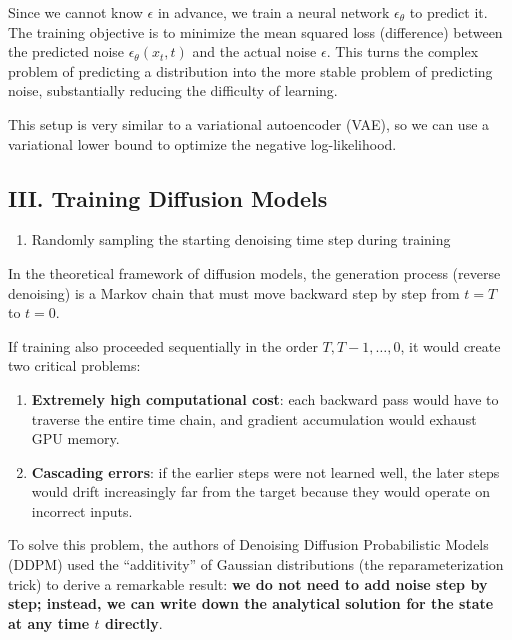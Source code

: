Since we cannot know \(\epsilon\) in advance, we train a neural network \(\epsilon_\theta\) to predict it. The training objective is to minimize the mean squared loss (difference) between the predicted noise \(\epsilon_\theta(x_t,t)\) and the actual noise \(\epsilon\). This turns the complex problem of predicting a distribution into the more stable problem of predicting noise, substantially reducing the difficulty of learning.

This setup is very similar to a variational autoencoder (VAE), so we can use a variational lower bound to optimize the negative log-likelihood.

\hypertarget{iii.-training-diffusion-models}{%
\subsection{III. Training Diffusion Models}\label{iii.-training-diffusion-models}}

\begin{enumerate}
\def\labelenumi{\arabic{enumi}.}
\tightlist
\item
  Randomly sampling the starting denoising time step during training
\end{enumerate}

In the theoretical framework of diffusion models, the generation process (reverse denoising) is a Markov chain that must move backward step by step from \(t=T\) to \(t=0\).

If training also proceeded sequentially in the order \(T,T-1,\ldots,0\), it would create two critical problems:

\begin{enumerate}
\def\labelenumi{\arabic{enumi}.}
\tightlist
\item
  \textbf{Extremely high computational cost}: each backward pass would have to traverse the entire time chain, and gradient accumulation would exhaust GPU memory.
\item
  \textbf{Cascading errors}: if the earlier steps were not learned well, the later steps would drift increasingly far from the target because they would operate on incorrect inputs.
\end{enumerate}

To solve this problem, the authors of Denoising Diffusion Probabilistic Models (DDPM) used the ``additivity'' of Gaussian distributions (the reparameterization trick) to derive a remarkable result: \textbf{we do not need to add noise step by step; instead, we can write down the analytical solution for the state at any time \(t\) directly}.

